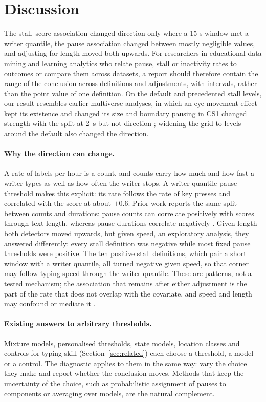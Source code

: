 \section{Discussion}
\label{sec:discussion}

The stall--score association changed direction only where a 15-s window met a writer quantile, the pause association
changed between mostly negligible values, and adjusting for length moved both upwards. For researchers in educational
data mining and learning analytics who relate pause, stall or inactivity rates to outcomes or compare them across
datasets, a report should therefore contain the range of the
conclusion across definitions and adjustments, with intervals, rather than the point value of one definition. On the
default and precedented stall levels, our result resembles earlier multiverse analyses, in which an eye-movement effect
kept its existence and changed its size \cite{godwin2025multiverse} and boundary pausing in CS1 changed strength with
the split at 2~s but not direction \cite{koutcheme2026keystroke}; widening the grid to levels around the default also
changed the direction.

\paragraph{Why the direction can change.} A rate of labels per hour is a count, and counts carry how much and how fast
a writer types as well as how often the writer stops. A writer-quantile pause threshold makes this explicit: its rate
follows the rate of key presses and correlated with the score at about $+0.6$. Prior work reports the same split
between counts and durations: pause counts can correlate positively with scores through text length, whereas pause
durations correlate negatively \cite{schaller2026keyscore}. Given length both detectors moved upwards, but
given speed, an exploratory analysis, they answered differently: every stall definition was negative while most fixed
pause thresholds were positive. The ten positive stall definitions, which pair a short window with a writer quantile,
all turned negative given speed, so that corner may follow typing speed through the writer quantile. These are
patterns, not a tested mechanism; the association that remains after either adjustment is the part of the rate that
does not overlap with the covariate, and speed and length may confound or mediate it \cite{mackinnon2000equivalence}.

\paragraph{Existing answers to arbitrary thresholds.} Mixture models, personalised thresholds, state models, location
classes and controls for typing skill (Section~\ref{sec:related}) each choose a threshold, a model or a control. The
diagnostic applies to them in the same way: vary the choice they make and report whether the conclusion moves. Methods
that keep the uncertainty of the choice, such as probabilistic assignment of pauses to components or averaging over
models, are the natural complement.

